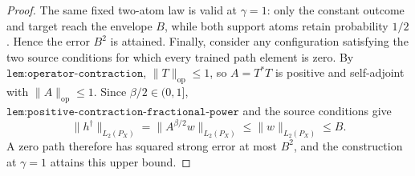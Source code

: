 \begin{proof}
The same fixed two-atom law is valid at \(\gamma=1\): only the constant outcome and target reach the envelope \(B\), while both support atoms retain probability \(1/2\). Hence the error \(B^2\) is attained. Finally, consider any configuration satisfying the two source conditions for which every trained path element is zero. By \(\texttt{lem:operator-contraction}\), \(\|T\|_{\mathrm{op}}\le1\), so \(A=T^*T\) is positive and self-adjoint with \(\|A\|_{\mathrm{op}}\le1\). Since \(\beta/2\in(0,1]\), \(\texttt{lem:positive-contraction-fractional-power}\) and the source conditions give
\[
 \|h^\dagger\|_{L_2(P_X)}
 =\|A^{\beta/2}w\|_{L_2(P_X)}
 \le\|w\|_{L_2(P_X)}
 \le B.
\]
A zero path therefore has squared strong error at most \(B^2\), and the construction at \(\gamma=1\) attains this upper bound.
\end{proof}